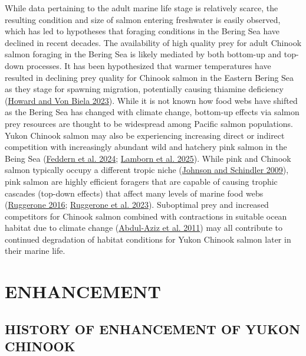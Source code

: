 \documentclass[11pt]{book}
\begin{document}
While data pertaining to the adult marine life stage is relatively scarce, the resulting condition and size of salmon entering freshwater is easily observed, which has led to hypotheses that foraging conditions in the Bering Sea have declined in recent decades. The availability of high quality prey for adult Chinook salmon foraging in the Bering Sea is likely mediated by both bottom-up and top-down processes. It has been hypothesized that warmer temperatures have resulted in declining prey quality for Chinook salmon in the Eastern Bering Sea as they stage for spawning migration, potentially causing thiamine deficiency (\protect\hyperlink{ref-howard2023}{Howard and Von Biela 2023}). While it is not known how food webs have shifted as the Bering Sea has changed with climate change, bottom-up effects via salmon prey resources are thought to be widespread among Pacific salmon populations. Yukon Chinook salmon may also be experiencing increasing direct or indirect competition with increasingly abundant wild and hatchery pink salmon in the Being Sea (\protect\hyperlink{ref-feddern2024}{Feddern et al. 2024}; \protect\hyperlink{ref-lamborn2025}{Lamborn et al. 2025}). While pink and Chinook salmon typically occupy a different tropic niche (\protect\hyperlink{ref-johnson2009}{Johnson and Schindler 2009}), pink salmon are highly efficient foragers that are capable of causing trophic cascades (top-down effects) that affect many levels of marine food webs (\protect\hyperlink{ref-ruggerone2016}{Ruggerone 2016}; \protect\hyperlink{ref-ruggerone2023}{Ruggerone et al. 2023}). Suboptimal prey and increased competitors for Chinook salmon combined with contractions in suitable ocean habitat due to climate change (\protect\hyperlink{ref-abdul-aziz2011}{Abdul-Aziz et al. 2011}) may all contribute to continued degradation of habitat conditions for Yukon Chinook salmon later in their marine life.

\hypertarget{sec:enhancement}{%
\section{ENHANCEMENT}\label{sec:enhancement}}

\hypertarget{history-of-enhancement-of-yukon-chinook}{%
\subsection{HISTORY OF ENHANCEMENT OF YUKON CHINOOK}\label{history-of-enhancement-of-yukon-chinook}}
\end{document}
